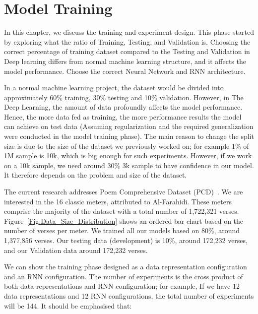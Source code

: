 \chapter{Model Training}\label{Ch:Model_Training}

{\color{red} In this chapter, we discuss the training and experiment design. This phase started by exploring what the ratio of Training, Testing, and Validation is. Choosing the correct percentage of training dataset compared to the Testing and Validation in Deep learning differs from normal machine learning structure, and it affects the model performance. Choose the correct Neural Network and RNN architecture.}

\clearpage


In a normal machine learning project, the dataset would be divided into approximately 60\% training, 30\% testing and 10\% validation. However, in The Deep Learning, the amount of data profoundly affects the model performance. 
Hence, the more data fed as training, the more performance results the model can achieve on test data (Assuming regularization and the required generalization were conducted in the model training phase). 
The main reason to change the split size is due to the size of the dataset we previously worked on; for example 1\% of 1M sample is 10k, which is big enough for such experiments. 
However, if we work on a 10k sample, we need around 30\% 3k sample to have confidence in our model. It therefore depends on the problem and size of the dataset.

The current research addresses Poem Comprehensive Dataset (PCD)~\cite{ArabicpoetryDS}. We are interested in the 16 classic meters, attributed to Al-Farahidi. These meters comprise the majority of the dataset with a total number of 1,722,321 verses. Figure~\ref{Fig:Data_Size_Distribution} shows an ordered bar chart based on the number of verses per meter. We trained all our models based on 80\%, around 1,377,856 verses. Our testing data (development) is 10\%, around 172,232 verses, and our Validation data around 172,232 verses.

We can show the training phase designed as a data representation configuration and an RNN configuration. The number of experiments is the cross product of both data representations and RNN configuration; for example, If we have 12 data representations and 12 RNN configurations, the total number of experiments will be 144. It should be emphasised that:

